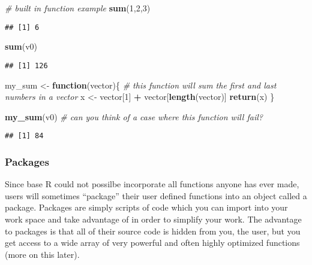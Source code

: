 \documentclass[]{article}
\newenvironment{Shaded}{\begin{snugshade}}{\end{snugshade}}
\newcommand{\CommentTok}[1]{\textcolor[rgb]{0.56,0.35,0.01}{\textit{#1}}}
\newcommand{\ControlFlowTok}[1]{\textcolor[rgb]{0.13,0.29,0.53}{\textbf{#1}}}
\newcommand{\DecValTok}[1]{\textcolor[rgb]{0.00,0.00,0.81}{#1}}
\newcommand{\KeywordTok}[1]{\textcolor[rgb]{0.13,0.29,0.53}{\textbf{#1}}}
\newcommand{\NormalTok}[1]{#1}
\newcommand{\OperatorTok}[1]{\textcolor[rgb]{0.81,0.36,0.00}{\textbf{#1}}}
\newcommand{\StringTok}[1]{\textcolor[rgb]{0.31,0.60,0.02}{#1}}
\begin{document}
\begin{Shaded}
\begin{Highlighting}[]
\CommentTok{# built in function example }
\KeywordTok{sum}\NormalTok{(}\DecValTok{1}\NormalTok{,}\DecValTok{2}\NormalTok{,}\DecValTok{3}\NormalTok{)}
\end{Highlighting}
\end{Shaded}

\begin{verbatim}
## [1] 6
\end{verbatim}

\begin{Shaded}
\begin{Highlighting}[]
\KeywordTok{sum}\NormalTok{(v0)}
\end{Highlighting}
\end{Shaded}

\begin{verbatim}
## [1] 126
\end{verbatim}

\begin{Shaded}
\begin{Highlighting}[]
\NormalTok{my_sum <-}\StringTok{ }\ControlFlowTok{function}\NormalTok{(vector)\{}
  \CommentTok{# this function will sum the first and last numbers in a vector }
\NormalTok{  x <-}\StringTok{ }\NormalTok{vector[}\DecValTok{1}\NormalTok{] }\OperatorTok{+}\StringTok{ }\NormalTok{vector[}\KeywordTok{length}\NormalTok{(vector)]}
  \KeywordTok{return}\NormalTok{(x)}
\NormalTok{\}}

\KeywordTok{my_sum}\NormalTok{(v0) }\CommentTok{# can you think of a case where this function will fail? }
\end{Highlighting}
\end{Shaded}

\begin{verbatim}
## [1] 84
\end{verbatim}

\hypertarget{packages}{%
\subsubsection{Packages}\label{packages}}

Since base R could not possilbe incorporate all functions anyone has
ever made, users will sometimes ``package'' their user defined functions
into an object called a package. Packages are simply scripts of code
which you can import into your work space and take advantage of in order
to simplify your work. The advantage to packages is that all of their
source code is hidden from you, the user, but you get access to a wide
array of very powerful and often highly optimized functions (more on
this later).
\end{document}
